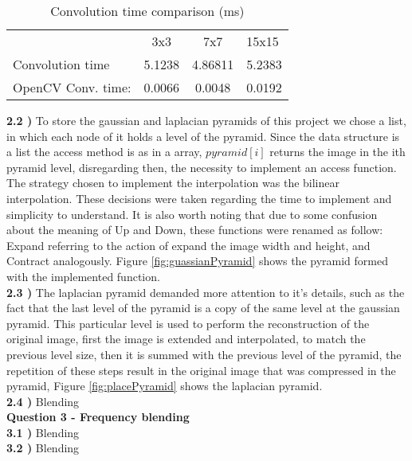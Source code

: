 \documentclass[12pt,a4paper]{article}
\begin{document}
\begin{table}[]
 \centering
 \caption{Convolution time comparison (ms)}
  \label{table:convolution-opencv}
 \begin{tabular}{lccl}
    \multicolumn{1}{c}{} & 3x3    & 7x7     & 15x15  \\
 Convolution time     &
    5.1238 & 4.86811 & 5.2383 \\
 OpenCV Conv. time:   & 0.0066 & 0.0048  &
    0.0192
 \end{tabular}
 \end{table}
 
\textbf{2.2 )} To store the gaussian and laplacian pyramids of this project we chose a list, in which each node of it holds a level of the pyramid. Since the data structure is a list the access method is as in a array, $pyramid[i]$ returns the image in the ith pyramid level, disregarding then, the necessity to implement an access function. The strategy chosen to implement the interpolation was the bilinear interpolation. These decisions were taken regarding the time to implement and simplicity to understand. It is also worth noting that due to some confusion about the meaning of Up and Down, these functions were renamed as follow: Expand referring to the action of expand the image width and height, and Contract analogously. Figure \ref{fig:guassianPyramid} shows the pyramid formed with the implemented function.\\

\textbf{2.3 )} The laplacian pyramid demanded more attention to it's details, such as the fact that the last level of the pyramid is a copy of the same level at the gaussian pyramid. This particular level is used to perform the reconstruction of the original image, first the image is extended and interpolated, to match the previous level size, then it is summed with the previous level of the pyramid, the repetition of these steps result in the original image that was compressed in the pyramid, Figure \ref{fig:placePyramid} shows the laplacian pyramid.\\

\textbf{2.4 )} Blending\\

\textbf{Question 3 - Frequency blending}\\

\textbf{3.1 )} Blending\\

\textbf{3.2 )} Blending\\
 
\end{document}
